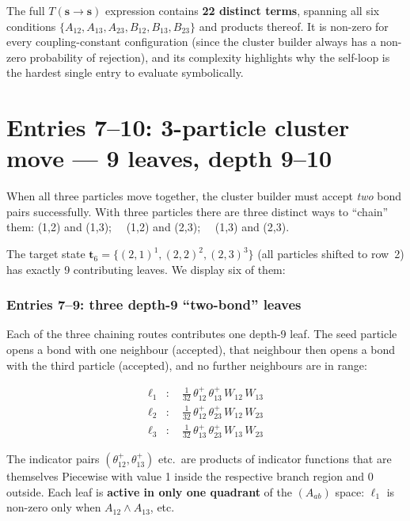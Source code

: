 \documentclass[11pt,a4paper]{article}
\newcommand{\W}[1]{W_{#1}}
\newcommand{\Afwd}[1]{\theta^{+}_{#1}}
\newcommand{\s}{\mathbf{s}}
\newcommand{\tp}{\mathbf{t}}
\begin{document}
The full $T(\s\to\s)$ expression contains \textbf{22 distinct terms},
spanning all six conditions $\{A_{12},A_{13},A_{23},B_{12},B_{13},B_{23}\}$
and products thereof.  It is non-zero for every coupling-constant
configuration (since the cluster builder always has a non-zero probability
of rejection), and its complexity highlights why the self-loop is the
hardest single entry to evaluate symbolically.

\section{Entries 7--10: 3-particle cluster move --- 9 leaves, depth 9--10}

When all three particles move together, the cluster builder must accept
\emph{two} bond pairs successfully.  With three particles there are three
distinct ways to ``chain'' them:
(1,2) and (1,3);~~ (1,2) and (2,3);~~ (1,3) and (2,3).

The target state $\tp_6=\{(2,1)^1,(2,2)^2,(2,3)^3\}$ (all particles shifted
to row~2) has exactly 9 contributing leaves.  We display six of them:

\subsubsection*{Entries 7--9: three depth-9 ``two-bond'' leaves}

Each of the three chaining routes contributes one depth-9 leaf.  The seed
particle opens a bond with one neighbour (accepted), that neighbour then
opens a bond with the third particle (accepted), and no further neighbours
are in range:

\begin{align}
  \ell_1&:\quad
    \frac{1}{32}\,\Afwd{12}\,\Afwd{13}\,\W{12}\,\W{13}
    \label{eq:l1}\\[6pt]
  \ell_2&:\quad
    \frac{1}{32}\,\Afwd{12}\,\Afwd{23}\,\W{12}\,\W{23}
    \label{eq:l2}\\[6pt]
  \ell_3&:\quad
    \frac{1}{32}\,\Afwd{13}\,\Afwd{23}\,\W{13}\,\W{23}
    \label{eq:l3}
\end{align}

The indicator pairs $(\Afwd{12},\Afwd{13})$ etc.\ are products of indicator
functions that are themselves Piecewise with value 1 inside the respective
branch region and 0 outside.  Each leaf is \textbf{active in only one
quadrant} of the $(A_{ab})$ space: $\ell_1$ is non-zero only when
$A_{12}\wedge A_{13}$, etc.
\end{document}
